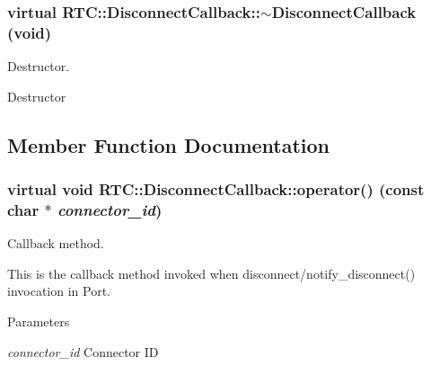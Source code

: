 \subsubsection[{$\sim$DisconnectCallback}]{\setlength{\rightskip}{0pt plus 5cm}virtual RTC::DisconnectCallback::$\sim$DisconnectCallback (void)\hspace{0.3cm}{\ttfamily  [inline, virtual]}}\label{classRTC_1_1DisconnectCallback_aee020344969e3996b91d6bf3873c9aab}


Destructor. 

Destructor 

\subsection{Member Function Documentation}
\subsubsection[{operator()}]{\setlength{\rightskip}{0pt plus 5cm}virtual void RTC::DisconnectCallback::operator() (const char $\ast$ {\em connector\_\-id})\hspace{0.3cm}{\ttfamily  [pure virtual]}}\label{classRTC_1_1DisconnectCallback_a2b4b524ad261d6da63e6649434015dab}


Callback method. 

This is the callback method invoked when disconnect/notify\_\-disconnect() invocation in Port.


\begin{DoxyParams}{Parameters}
\item[{\em connector\_\-id}]Connector ID \end{DoxyParams}
